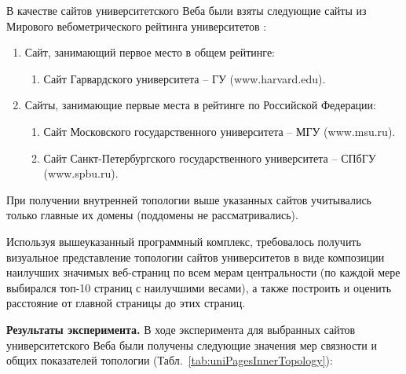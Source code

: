 В качестве сайтов университетского Веба были взяты следующие сайты из Мирового вебометрического рейтинга университетов \cite{RankingWeb}:
\begin{enumerate}
	\item Сайт, занимающий первое место в общем рейтинге:
		\begin{enumerate}
				\item Сайт Гарвардского университета -- ГУ (www.harvard.edu). 
			\end{enumerate}
	\item Сайты, занимающие первые места в рейтинге по Российской Федерации: 
		\begin{enumerate}
				\item Сайт Московского государственного университета -- МГУ (www.msu.ru). 
				\item Сайт Санкт-Петербургского государственного университета -- СПбГУ (www.spbu.ru).
			\end{enumerate}
\end{enumerate}

При получении внутренней топологии выше указанных сайтов учитывались только главные их домены (поддомены не рассматривались). 

Используя вышеуказанный программный комплекс, требовалось получить визуальное представление топологии сайтов университетов в виде композиции наилучших значимых веб-страниц по всем мерам центральности (по каждой мере выбирался топ-10 страниц с наилучшими весами), а также построить и оценить расстояние от главной страницы до этих страниц.

\textbf{Результаты эксперимента.} В ходе эксперимента для выбранных сайтов университетского Веба были получены следующие значения мер связности и общих показателей топологии (Табл.~\cref{tab:uniPagesInnerTopology}):

